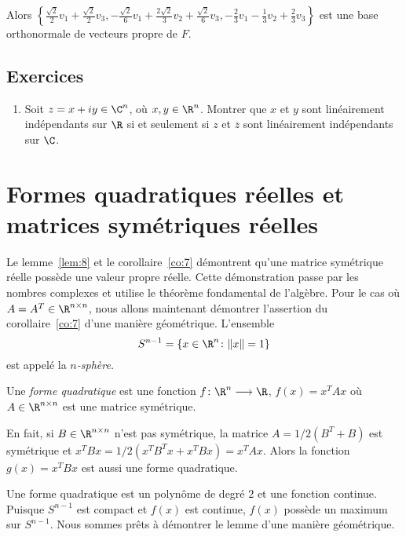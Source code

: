 \begin{example}
Alors $\left\{\frac{\sqrt{2}}{2}v_1 + \frac{\sqrt{2}}{2} v_3,- \frac{\sqrt{2}}{6}v_1 + \frac{2 \sqrt{2}}{3}v_2 + \frac{\sqrt{2}}{6} v_3 , -\frac{2}{3}v_1-\frac{1}{3}v_2+\frac{2}{3}v_3\right\}$ est une base orthonormale de vecteurs propre de $F$. 

\end{example}

\subsection*{Exercices}

\begin{enumerate}
\item Soit $z = x + iy \in \C^n$, où $x,y \in \R^n$. Montrer que $x$ et $y$ sont linéairement indépendants sur $\R$ si et seulement si $z$ et $\overline{z}$ sont linéairement indépendants sur  $\C$. 
\end{enumerate}


\section{Formes quadratiques réelles et matrices symétriques réelles}
\label{sec:form-quadr-reell}

Le lemme~\ref{lem:8} et le corollaire~\ref{co:7} démontrent qu'une matrice symétrique réelle possède une valeur propre réelle. Cette démonstration passe par les nombres complexes et utilise le théorème fondamental de l'algèbre. Pour le cas où $A = A^T \in \R^{n \times n}$, nous allons maintenant démontrer l'assertion du  corollaire~\ref{co:7}  d'une manière géométrique. L'ensemble 
\begin{displaymath}
  S^{n-1} = \{x \in \R^n \colon \|x\| = 1 \} 
\end{displaymath}
est appelé la \emph{$n$-sphère.} 

\begin{definition}
  \label{def:21}
  Une \emph{forme quadratique} est une fonction
  $f\colon \R^n \longrightarrow \R$,
  $f(x) = x^T A x$
  où $A \in \R^{n \times n}$ est une matrice symétrique.
\end{definition}
En fait, si $B \in \R^{n \times n}$
n'est pas symétrique, la matrice $A = 1/2 (B^T + B)$
est symétrique et $x^TBx = 1/2 (x^TB^T x + x^T B x) = x^T Ax$.
Alors la fonction $g(x) = x^TBx$ est aussi une forme quadratique.

Une {forme quadratique} est un polynôme de degré $2$
et une fonction continue. Puisque $S^{n-1}$
est compact et $f(x)$
est continue, $f(x)$
possède un maximum sur $S^{n-1}$.
Nous sommes prêts à démontrer le lemme d'une manière géométrique.

